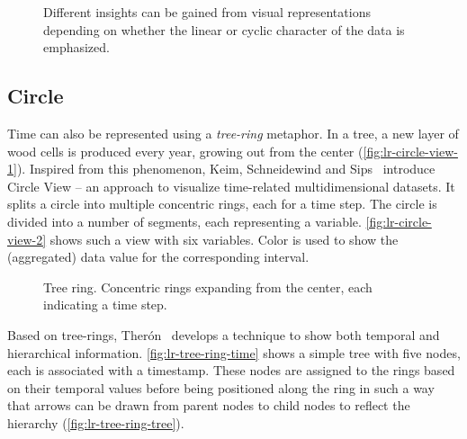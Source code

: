 \begin{figure}[!htb]
\centering
{}
\hfill
{}
\hfill
{}
\caption{Different insights can be gained from visual representations depending on whether the linear or cyclic character of the data is emphasized. }
\label{fig:lr-spiral-all}
\end{figure}

\subsection{Circle}
Time can also be represented using a \emph{tree-ring} metaphor. In a tree, a new layer of wood cells is produced every year, growing out from the center (\autoref{fig:lr-circle-view-1}). Inspired from this phenomenon, Keim, Schneidewind and Sips~\cite{Keim2004} introduce Circle View -- an approach to visualize time-related multidimensional datasets. It splits a circle into multiple concentric rings, each for a time step. The circle is divided into a number of segments, each representing a variable. \autoref{fig:lr-circle-view-2} shows such a view with six variables. Color is used to show the (aggregated) data value for the corresponding interval.

\begin{figure}[!htb]
\centering
{}
\hfill
{}
\caption{Tree ring. Concentric rings expanding from the center, each indicating a time step.}
\label{fig:lr-circle-view}
\end{figure}

Based on tree-rings, Therón~\cite{Theron2006} develops a technique to show both temporal and hierarchical information. \autoref{fig:lr-tree-ring-time} shows a simple tree with five nodes, each is associated with a timestamp. These nodes are assigned to the rings based on their temporal values before being positioned along the ring in such a way that arrows can be drawn from parent nodes to child nodes to reflect the hierarchy (\autoref{fig:lr-tree-ring-tree}).

